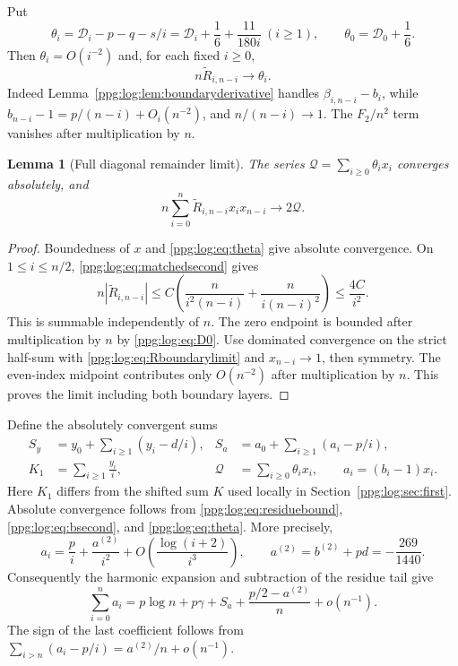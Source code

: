 \documentclass[11pt,letterpaper]{article}
\newtheorem{lemma}[theorem]{Lemma}
\theoremstyle{remark}\newtheorem{remark}[theorem]{Remark}
\numberwithin{equation}{section}
\begin{document}
Put
\begin{equation}\label{ppg:log:eq:theta}
 \theta_i=\mathcal D_i-p-q-s/i
          =\mathcal D_i+\frac16+\frac{11}{180i}\ (i\ge1),\qquad
 \theta_0=\mathcal D_0+\frac16.
\end{equation}
Then $\theta_i=O(i^{-2})$ and, for each fixed $i\ge0$,
\begin{equation}\label{ppg:log:eq:Rboundarylimit}
 n\widetilde R_{i,n-i}\longrightarrow\theta_i.
\end{equation}
Indeed Lemma~\ref{ppg:log:lem:boundaryderivative} handles $\beta_{i,n-i}-b_i$, while $b_{n-i}-1=p/(n-i)+O_i(n^{-2})$, and $n/(n-i)\to1$. The $F_2/n^2$ term vanishes after multiplication by $n$.

\begin{lemma}[Full diagonal remainder limit]\label{ppg:log:lem:diagonallimit}
The series $\mathcal Q=\sum_{i\ge0}\theta_ix_i$ converges absolutely, and
\begin{equation}\label{ppg:log:eq:diagonallimit}
 n\sum_{i=0}^n\widetilde R_{i,n-i}x_ix_{n-i}\longrightarrow2\mathcal Q.
\end{equation}
\end{lemma}
\begin{proof}
Boundedness of $x$ and \eqref{ppg:log:eq:theta} give absolute convergence. On $1\le i\le n/2$, \eqref{ppg:log:eq:matchedsecond} gives
\[
 n|\widetilde R_{i,n-i}|
 \le C\left(\frac n{i^2(n-i)}+\frac n{i(n-i)^2}\right)
 \le\frac{4C}{i^2}.
\]
This is summable independently of $n$. The zero endpoint is bounded after multiplication by $n$ by \eqref{ppg:log:eq:D0}. Use dominated convergence on the strict half-sum with \eqref{ppg:log:eq:Rboundarylimit} and $x_{n-i}\to1$, then symmetry. The even-index midpoint contributes only $O(n^{-2})$ after multiplication by $n$. This proves the limit including both boundary layers.
\end{proof}

Define the absolutely convergent sums
\begin{align}
 S_y&=y_0+\sum_{i\ge1}(y_i-d/i),&
 S_a&=a_0+\sum_{i\ge1}(a_i-p/i),\label{ppg:log:eq:residuesums}\\
 K_1&=\sum_{i\ge1}\frac{y_i}{i},&
 \mathcal Q&=\sum_{i\ge0}\theta_ix_i,
 \qquad a_i=(b_i-1)x_i.\nonumber
\end{align}
Here $K_1$ differs from the shifted sum $K$ used locally in Section~\ref{ppg:log:sec:first}. Absolute convergence follows from \eqref{ppg:log:eq:residuebound}, \eqref{ppg:log:eq:bsecond}, and \eqref{ppg:log:eq:theta}. More precisely,
\begin{equation}\label{ppg:log:eq:asecond}
 a_i=\frac p i+\frac{a^{(2)}}{i^2}
           +O\!\left(\frac{\log(i+2)}{i^3}\right),\qquad
 a^{(2)}=b^{(2)}+pd=-\frac{269}{1440}.
\end{equation}
Consequently the harmonic expansion and subtraction of the residue tail give
\begin{equation}\label{ppg:log:eq:apartialsecond}
 \sum_{i=0}^na_i=p\log n+p\gamma+S_a
                 +\frac{p/2-a^{(2)}}n+o(n^{-1}).
\end{equation}
The sign of the last coefficient follows from
$\sum_{i>n}(a_i-p/i)=a^{(2)}/n+o(n^{-1})$.
\end{document}
